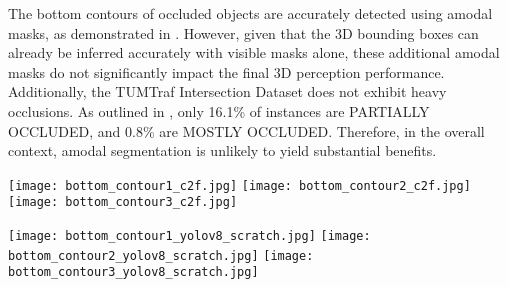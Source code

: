 \begin{itemize}
	The bottom contours of occluded objects are accurately detected using amodal masks, as demonstrated in . However, given that the 3D bounding boxes can already be inferred accurately with visible masks alone, these additional amodal masks do not significantly impact the final 3D perception performance. Additionally, the TUMTraf Intersection Dataset does not exhibit heavy occlusions. As outlined in , only 16.1\% of instances are PARTIALLY OCCLUDED, and 0.8\% are MOSTLY OCCLUDED. Therefore, in the overall context, amodal segmentation is unlikely to yield substantial benefits.
	
	\begin{minipage}{\linewidth}
		\centering
		\begin{minipage}[b]{\textwidth}
			\centering
			\texttt{[image: bottom\_contour1\_c2f.jpg]}
			\texttt{[image: bottom\_contour2\_c2f.jpg]}
			\texttt{[image: bottom\_contour3\_c2f.jpg]}
		\end{minipage}
		\hfill
		\begin{minipage}[b]{\textwidth}
			\centering
			\texttt{[image: bottom\_contour1\_yolov8\_scratch.jpg]}
			\texttt{[image: bottom\_contour2\_yolov8\_scratch.jpg]}
			\texttt{[image: bottom\_contour3\_yolov8\_scratch.jpg]}
		\end{minipage}
		\label{fig:bottom_contour}
	\end{minipage}
	
\end{itemize}






